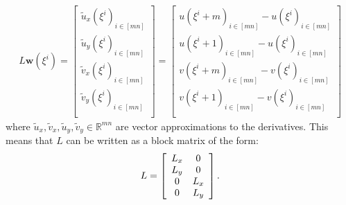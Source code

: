 \begin{align*}
L \textbf{w}(\xi^i) = \begin{bmatrix}
         \tilde{u}_x(\xi^i)_{i\in [mn]}  \\
         \tilde{u}_y(\xi^i)_{i\in [mn]}  \\
         \tilde{v}_x(\xi^i)_{i\in [mn]} \\
         \tilde{v}_y (\xi^i)_{i\in [mn]} \\
        \end{bmatrix} =
         \begin{bmatrix}
         u(\xi^i+m)_{i\in [mn]} - u(\xi^i)_{i\in [mn]}  \\
         u(\xi^i+1)_{i\in [mn]} - u(\xi^i)_{i\in [mn]}  \\
         v(\xi^i+m)_{i\in [mn]} - v(\xi^i)_{i\in [mn]} \\
         v(\xi^i+1)_{i\in [mn]} - v(\xi^i)_{i\in [mn]} \\
        \end{bmatrix}
\end{align*}
where $\tilde{u}_x, \tilde{v}_x, \tilde{u}_y, \tilde{v}_y \in \mathbb{R}^{mn}$ are vector approximations to the derivatives. This means that $L$ can be written as a block matrix of the form:
\begin{align*}
L = \left[
\begin{array}{c c}
L_x & 0 \\
L_y & 0\\
0 & L_x \\
0 & L_y \\
\end{array}
\right].
\end{align*}



